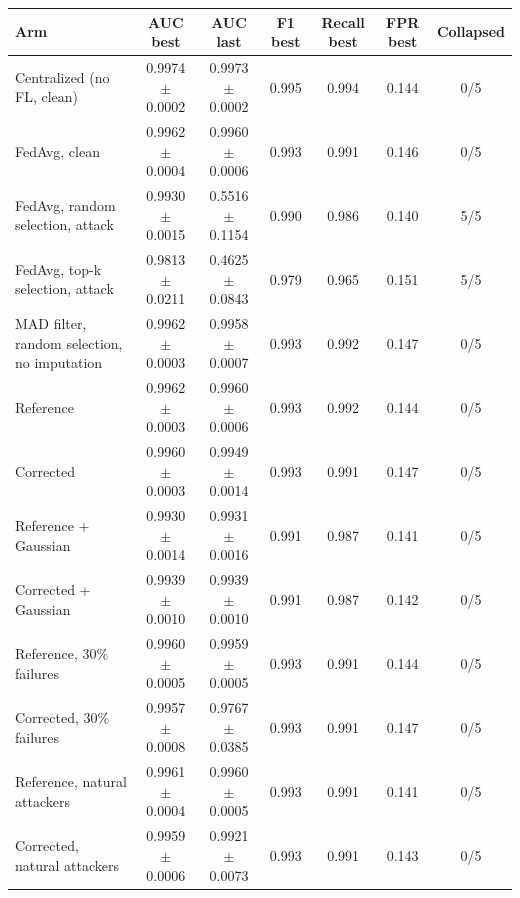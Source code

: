 \begin{tabular}{@{}lcccccc@{}}\toprule
Arm & AUC best & AUC last & F1 best & Recall best & FPR best & Collapsed\\
\midrule
Centralized (no FL, clean) & 0.9974$\pm$0.0002 & 0.9973$\pm$0.0002 & 0.995 & 0.994 & 0.144 & 0/5 \\
FedAvg, clean & 0.9962$\pm$0.0004 & 0.9960$\pm$0.0006 & 0.993 & 0.991 & 0.146 & 0/5 \\
FedAvg, random selection, attack & 0.9930$\pm$0.0015 & 0.5516$\pm$0.1154 & 0.990 & 0.986 & 0.140 & 5/5 \\
FedAvg, top-k selection, attack & 0.9813$\pm$0.0211 & 0.4625$\pm$0.0843 & 0.979 & 0.965 & 0.151 & 5/5 \\
MAD filter, random selection, no imputation & 0.9962$\pm$0.0003 & 0.9958$\pm$0.0007 & 0.993 & 0.992 & 0.147 & 0/5 \\
Reference & 0.9962$\pm$0.0003 & 0.9960$\pm$0.0006 & 0.993 & 0.992 & 0.144 & 0/5 \\
Corrected & 0.9960$\pm$0.0003 & 0.9949$\pm$0.0014 & 0.993 & 0.991 & 0.147 & 0/5 \\
Reference + Gaussian & 0.9930$\pm$0.0014 & 0.9931$\pm$0.0016 & 0.991 & 0.987 & 0.141 & 0/5 \\
Corrected + Gaussian & 0.9939$\pm$0.0010 & 0.9939$\pm$0.0010 & 0.991 & 0.987 & 0.142 & 0/5 \\
Reference, 30\% failures & 0.9960$\pm$0.0005 & 0.9959$\pm$0.0005 & 0.993 & 0.991 & 0.144 & 0/5 \\
Corrected, 30\% failures & 0.9957$\pm$0.0008 & 0.9767$\pm$0.0385 & 0.993 & 0.991 & 0.147 & 0/5 \\
Reference, natural attackers & 0.9961$\pm$0.0004 & 0.9960$\pm$0.0005 & 0.993 & 0.991 & 0.141 & 0/5 \\
Corrected, natural attackers & 0.9959$\pm$0.0006 & 0.9921$\pm$0.0073 & 0.993 & 0.991 & 0.143 & 0/5 \\
\bottomrule\end{tabular}
